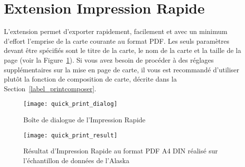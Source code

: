
\section{Extension Impression Rapide}\label{quickprint}


L'extension  permet d'exporter rapidement, facilement et avec un minimum d'effort l'emprise de la carte courante au format PDF. Les seuls paramètres devant être spécifiés sont le titre  de la carte, le nom de la carte et la taille de la page (voir la Figure~\ref{fig:quickprint}).  Si vous avez besoin de procéder à des réglages supplémentaires sur la mise en  page de carte, il vous est recommandé d'utiliser plutôt la fonction de composition de carte, décrite dans la Section~\ref{label_printcomposer}.

\begin{figure}[htb]
\centering
   \texttt{[image: quick\_print\_dialog]}
 \caption{Boîte de dialogue de l'Impression Rapide \nixcaption}\label{fig:quickprint}
\end{figure}

\begin{figure}[htb]
\centering
   \texttt{[image: quick\_print\_result]}
   \caption{Résultat d'Impression Rapide au format PDF A4 DIN réalisé sur 
   l'échantillon de données de l'Alaska\nixcaption}\label{fig:quickprint_result}
\end{figure}
